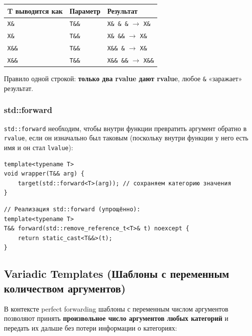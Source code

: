 \documentclass[a4paper,12pt]{article}
\begin{document}
\begin{center}
\begin{tabular}{l l l}
\toprule
\textbf{T выводится как} & \textbf{Параметр} & \textbf{Результат} \\
\midrule
\texttt{X\&}  & \texttt{T\&\&} & \texttt{X\& \& \&} $\to$ \texttt{X\&} \\
\texttt{X\&}  & \texttt{T\&\&} & \texttt{X\& \&\&} $\to$ \texttt{X\&} \\
\texttt{X\&\&} & \texttt{T\&\&} & \texttt{X\&\& \&} $\to$ \texttt{X\&} \\
\texttt{X\&\&} & \texttt{T\&\&} & \texttt{X\&\& \&\&} $\to$ \texttt{X\&\&} \\
\bottomrule
\end{tabular}
\end{center}

Правило одной строкой: \textbf{только два rvalue дают rvalue}, любое \texttt{\&}
«заражает» результат.

\subsubsection{std::forward}

\texttt{std::forward} необходим, чтобы внутри функции превратить аргумент обратно в
\texttt{rvalue}, если он изначально был таковым (поскольку внутри функции у него есть
имя и он стал \texttt{lvalue}):

\begin{lstlisting}
template<typename T>
void wrapper(T&& arg) {
    target(std::forward<T>(arg)); // сохраняем категорию значения
}
\end{lstlisting}

\begin{lstlisting}
// Реализация std::forward (упрощённо):
template<typename T>
T&& forward(std::remove_reference_t<T>& t) noexcept {
    return static_cast<T&&>(t);
}
\end{lstlisting}

\subsection{Variadic Templates (Шаблоны с переменным количеством аргументов)}

В контексте perfect forwarding шаблоны с переменным числом аргументов позволяют
принять \textbf{произвольное число аргументов любых категорий} и передать их дальше
без потери информации о категориях:
\end{document}
